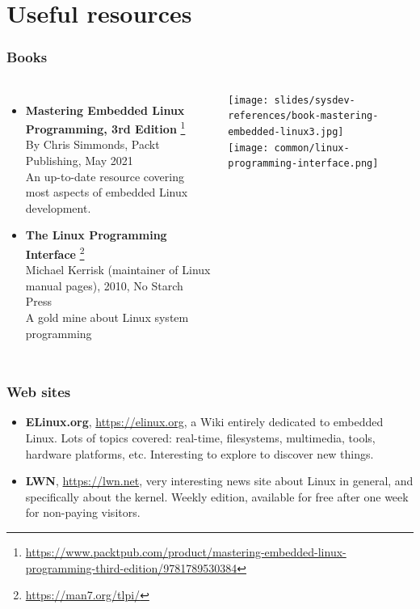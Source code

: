 \section{Useful resources}

\begin{frame}
  \frametitle{Books}
  \begin{columns}[T]
    \small
    \begin{itemize}
    \item {\bf Mastering Embedded Linux Programming, 3rd Edition}
      \footnote{\tiny
\url{https://www.packtpub.com/product/mastering-embedded-linux-programming-third-edition/9781789530384}}\\
      By Chris Simmonds, Packt Publishing, May 2021\\
      An up-to-date resource covering most aspects of embedded Linux
      development.
    \item {\bf The Linux Programming Interface}
      \footnote{\tiny \url{https://man7.org/tlpi/}}\\
      Michael Kerrisk (maintainer of Linux manual pages), 2010, No Starch Press\\
      A gold mine about Linux system programming\\
    \end{itemize}
    \normalsize
    \texttt{[image: slides/sysdev-references/book-mastering-embedded-linux3.jpg]}\\
    \vspace{0.5cm}
    \texttt{[image: common/linux-programming-interface.png]}\\
  \end{columns}
\end{frame}

\begin{frame}
  \frametitle{Web sites}
  \begin{itemize}
  \item {\bf ELinux.org}, \url{https://elinux.org}, a Wiki entirely
    dedicated to embedded Linux. Lots of topics covered: real-time,
    filesystems, multimedia, tools, hardware platforms,
    etc. Interesting to explore to discover new things.
  \item {\bf LWN}, \url{https://lwn.net}, very interesting news site
    about Linux in general, and specifically about the kernel. Weekly
    edition, available for free after one week for non-paying
    visitors.
  \end{itemize}
\end{frame}

